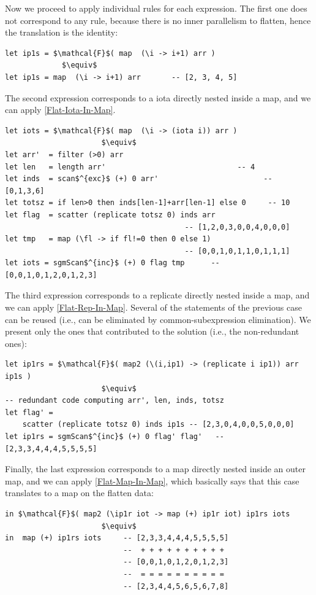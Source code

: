 \documentclass[acmsmall,review]{acmart}\settopmatter{printfolios=true,printccs=false,printacmref=false}
\begin{document}
Now we proceed to apply individual rules for each expression.
The first one does not correspond to any rule, because there is
no inner parallelism to flatten, hence the translation is the identity:

\newpage
\begin{lstlisting}[mathescape=true]
let ip1s = $\mathcal{F}$( map  (\i -> i+1) arr ) 
             $\equiv$
let ip1s = map  (\i -> i+1) arr       -- [2, 3, 4, 5]
\end{lstlisting}\vspace{-2ex}

The second expression corresponds to a iota directly nested inside a map,
and we can apply \cref{Flat-Iota-In-Map}.
\begin{lstlisting}[mathescape=true]
let iots = $\mathcal{F}$( map  (\i -> (iota i)) arr )  
                      $\equiv$
let arr'  = filter (>0) arr
let len   = length arr'                              -- 4
let inds  = scan$^{exc}$ (+) 0 arr'                        -- [0,1,3,6]
let totsz = if len>0 then inds[len-1]+arr[len-1] else 0     -- 10
let flag  = scatter (replicate totsz 0) inds arr
                                         -- [1,2,0,3,0,0,4,0,0,0]
let tmp   = map (\fl -> if fl!=0 then 0 else 1) 
                                         -- [0,0,1,0,1,1,0,1,1,1]
let iots = sgmScan$^{inc}$ (+) 0 flag tmp      -- [0,0,1,0,1,2,0,1,2,3]
\end{lstlisting}\vspace{-2ex}

The third expression corresponds to a replicate directly nested inside a map,
and we can apply \cref{Flat-Rep-In-Map}. Several of the statements of the 
previous case can be reused (i.e., can be eliminated by common-subexpression
elimination). We present only the ones that contributed to the solution
(i.e., the non-redundant ones):\medskip
\begin{lstlisting}[mathescape=true]
let ip1rs = $\mathcal{F}$( map2 (\(i,ip1) -> (replicate i ip1)) arr ip1s )
                      $\equiv$
-- redundant code computing arr', len, inds, totsz
let flag' = 
    scatter (replicate totsz 0) inds ip1s -- [2,3,0,4,0,0,5,0,0,0]
let ip1rs = sgmScan$^{inc}$ (+) 0 flag' flag'   -- [2,3,3,4,4,4,5,5,5,5]
\end{lstlisting}\vspace{-2ex}

Finally, the last expression corresponds to a map directly nested inside
an outer map, and we can apply \cref{Flat-Map-In-Map}, which basically says
that this case translates to a map on the flatten data:
\begin{lstlisting}[mathescape=true]
in $\mathcal{F}$( map2 (\ip1r iot -> map (+) ip1r iot) ip1rs iots
                      $\equiv$
in  map (+) ip1rs iots     -- [2,3,3,4,4,4,5,5,5,5]
                           --  + + + + + + + + + +
                           -- [0,0,1,0,1,2,0,1,2,3]
                           --  = = = = = = = = = =
                           -- [2,3,4,4,5,6,5,6,7,8]
\end{lstlisting}\vspace{-2ex}
\end{document}

